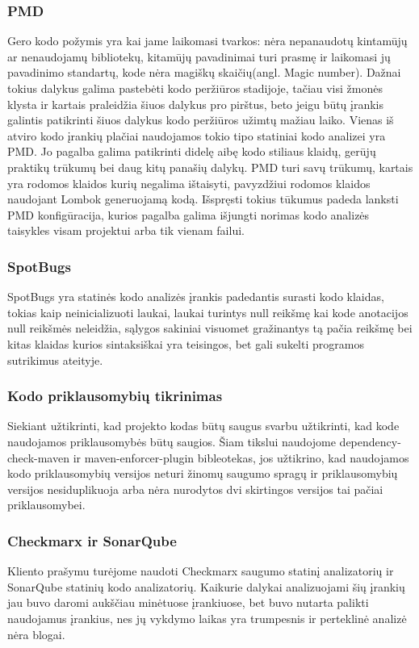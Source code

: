 \documentclass{VUMIFPSkursinis}
\begin{document}
		\subsubsection{PMD}
			Gero kodo požymis yra kai jame laikomasi tvarkos: nėra nepanaudotų kintamūjų ar nenaudojamų bibliotekų, kitamūjų pavadinimai turi prasmę ir laikomasi jų pavadinimo standartų, kode nėra magiškų skaičių(angl. Magic number). Dažnai tokius dalykus galima pastebėti kodo peržiūros stadijoje, tačiau visi žmonės klysta ir kartais praleidžia šiuos dalykus pro pirštus, beto jeigu būtų įrankis galintis patikrinti šiuos dalykus kodo peržiūros užimtų mažiau laiko.
			Vienas iš atviro kodo įrankių plačiai naudojamos tokio tipo statiniai kodo analizei yra PMD. Jo pagalba galima patikrinti didelę aibę kodo stiliaus klaidų, gerūjų praktikų trūkumų bei daug kitų panašių dalykų.
			PMD turi savų trūkumų, kartais yra rodomos klaidos kurių negalima ištaisyti, pavyzdžiui rodomos klaidos naudojant Lombok generuojamą kodą.
			Išspręsti tokius tūkumus padeda lanksti PMD konfigūracija, kurios pagalba galima išjungti norimas kodo analizės taisykles visam projektui arba tik vienam failui.
		\subsubsection{SpotBugs}
			SpotBugs yra statinės kodo analizės įrankis padedantis surasti kodo klaidas, tokias kaip neinicializuoti laukai, laukai turintys null reikšmę kai kode anotacijos null reikšmės neleidžia, sąlygos sakiniai visuomet gražinantys tą pačia reikšmę bei kitas klaidas kurios sintaksiškai yra teisingos, bet gali sukelti programos sutrikimus ateityje.
		\subsubsection{Kodo priklausomybių tikrinimas}
			Siekiant užtikrinti, kad projekto kodas būtų saugus svarbu užtikrinti, kad kode naudojamos priklausomybės būtų saugios.
			Šiam tikslui naudojome dependency-check-maven ir maven-enforcer-plugin bibleotekas, jos užtikrino, kad naudojamos kodo priklausomybių versijos neturi žinomų saugumo spragų ir priklausomybių versijos nesiduplikuoja arba nėra nurodytos dvi skirtingos versijos tai pačiai priklausomybei.
		\subsubsection{Checkmarx ir SonarQube}
			Kliento prašymu turėjome naudoti Checkmarx saugumo statinį analizatorių ir SonarQube statinių kodo analizatorių.
			Kaikurie dalykai analizuojami šių įrankių jau buvo daromi aukščiau minėtuose įrankiuose, bet buvo nutarta palikti naudojamus įrankius, nes jų vykdymo laikas yra trumpesnis ir perteklinė analizė nėra blogai.
\end{document}

